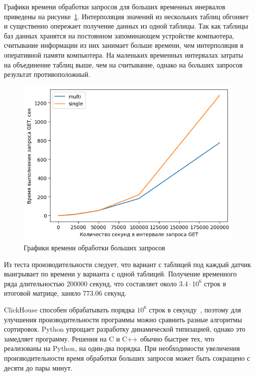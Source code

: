 Графики времени обработки запросов для больших временных инервалов приведены на рисунке~\ref{bench2e5}. Интерполяция значений из нескольких таблиц обгоняет и существенно опережает получение данных из одной таблицы. Так как таблицы баз данных хранятся на постоянном запоминающем устройстве компьютера, считывание информации из них занимает больше времени, чем интерполяция в оперативной памяти компьютера. На маленьких временных интервалах затраты на объединение таблиц выше, чем на считывание, однако на больших запросов результат противоположный.

\begin{figure}
    \includegraphics[scale=1.0]{../img/bench2e5.png}
    \caption{Графики времени обработки больших запросов}
    \label{bench2e5}
\end{figure}

Из теста производительности следует, что вариант с таблицей под каждый датчик выигрывает по времени у варианта с одной таблицей. Получение временного ряда длительностью $200000$ секунд, что составляет около $3.4 \cdot {10} ^ {6}$ строк в итоговой матрице, заняло $773.06$ секунд.

ClickHouse способен обрабатывать порядка ${10} ^ {6}$ строк в секунду~\cite{ch-perfomance}, поэтому для улучшения производительности программы можно сравнить разные алгоритмы сортировок. Python упрощает разработку динамической типизацией, однако это замедляет программу. Решения на C и C++ обычно быстрее тех, что реализованы на Python, на один-два порядка. При необходимости увеличения производительности время обработки больших запросов может быть сокращено с десяти до пары минут.
